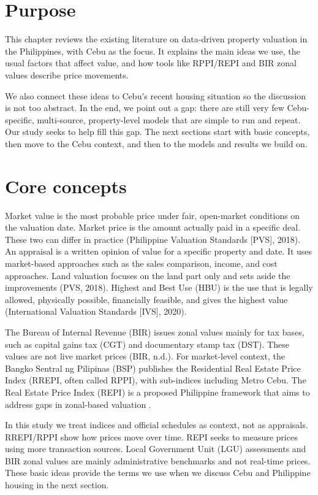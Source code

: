 \section{Purpose}

This chapter reviews the existing literature on data-driven property valuation in the Philippines, with Cebu as the focus. It explains the main ideas we use, the usual factors that affect value, and how tools like RPPI/REPI and BIR zonal values describe price movements.

We also connect these ideas to Cebu’s recent housing situation so the discussion is not too abstract. In the end, we point out a gap: there are still very few Cebu-specific, multi-source, property-level models that are simple to run and repeat. Our study seeks to help fill this gap. The next sections start with basic concepts, then move to the Cebu context, and then to the models and results we build on.

\section{Core concepts}

Market value is the most probable price under fair, open-market conditions on the valuation date. Market price is the amount actually paid in a specific deal. These two can differ in practice (Philippine Valuation Standards [PVS], 2018). An appraisal is a written opinion of value for a specific property and date. It uses market-based approaches such as the sales comparison, income, and cost approaches. Land valuation focuses on the land part only and sets aside the improvements (PVS, 2018). Highest and Best Use (HBU) is the use that is legally allowed, physically possible, financially feasible, and gives the highest value (International Valuation Standards [IVS], 2020).

The Bureau of Internal Revenue (BIR) issues zonal values mainly for tax bases, such as capital gains tax (CGT) and documentary stamp tax (DST). These values are not live market prices (BIR, n.d.). For market-level context, the Bangko Sentral ng Pilipinas (BSP) publishes the Residential Real Estate Price Index (RREPI, often called RPPI), with sub-indices including Metro Cebu. The Real Estate Price Index (REPI) is a proposed Philippine framework that aims to address gaps in zonal-based valuation \parencite{bsp2025, domingo2005}.

In this study we treat indices and official schedules as context, not as appraisals. RREPI/RPPI show how prices move over time. REPI seeks to measure prices using more transaction sources. Local Government Unit (LGU) assessments and BIR zonal values are mainly administrative benchmarks and not real-time prices. These basic ideas provide the terms we use when we discuss Cebu and Philippine housing in the next section.


